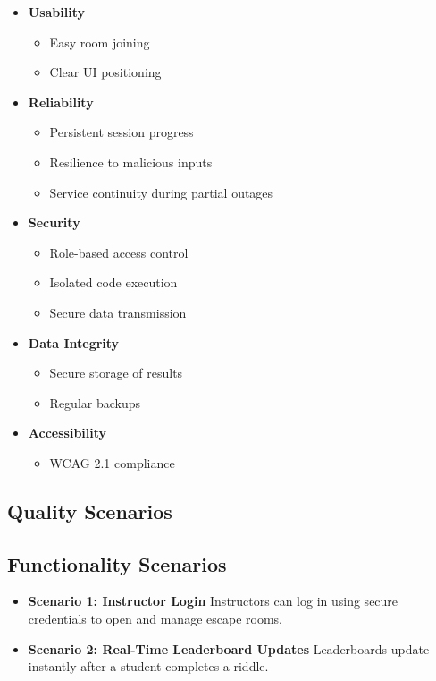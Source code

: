 \begin{itemize}
\begin{itemize}
    \item \textbf{Usability}
    \begin{itemize}
        \item Easy room joining
        \item Clear UI positioning
    \end{itemize}
    
    \item \textbf{Reliability}
    \begin{itemize}
        \item Persistent session progress
        \item Resilience to malicious inputs
        \item Service continuity during partial outages
    \end{itemize}
    
    \item \textbf{Security}
    \begin{itemize}
        \item Role-based access control
        \item Isolated code execution
        \item Secure data transmission
    \end{itemize}
    
    \item \textbf{Data Integrity}
    \begin{itemize}
        \item Secure storage of results
        \item Regular backups
    \end{itemize}
    
    \item \textbf{Accessibility}
    \begin{itemize}
        \item WCAG 2.1 compliance
    \end{itemize}
\end{itemize}

\hypertarget{_quality_scenarios}{%
\subsection{Quality Scenarios}\label{_quality_scenarios}}

\subsection{Functionality Scenarios}
\begin{itemize}
    \item \textbf{Scenario 1: Instructor Login}  
    Instructors can log in using secure credentials to open and manage escape rooms.
    \item \textbf{Scenario 2: Real-Time Leaderboard Updates}  
    Leaderboards update instantly after a student completes a riddle.
\end{itemize}


\end{itemize}

